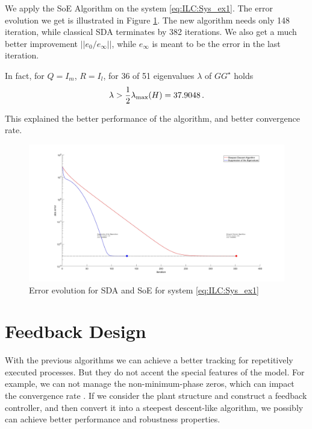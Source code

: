 \begin{exam}
	We apply the SoE Algorithm on the system \eqref{eq:ILC:Sys_ex1}. The error evolution we get is illustrated in Figure \ref{img:ILC:SDAvsSE}. The new algorithm needs only 148 iteration, while classical SDA terminates by 382 iterations. We also get a much better improvement $||e_0/e_\infty||$, while $e_\infty$  is meant to be the error in the last iteration. 
	
	In fact, for $Q = I_m$, $R = I_l$, for 36 of 51 eigenvalues $\lambda$ of $G G^\star$ holds 
	\begin{align}
	\lambda > \frac{1}{2}\lambda_{\mathrm{max}}(H) = 37.9048\, .
	\end{align}
	
	This explained the better performance of the algorithm, and better convergence rate.  		
	\begin{figure}[ht]
		\centering
		\includegraphics[width=\textwidth]{fig/Ex1_SDAvsES.jpg}
		\caption{Error evolution for SDA and SoE for system \eqref{eq:ILC:Sys_ex1}}
		\label{img:ILC:SDAvsSE}
	\end{figure}
	
\end{exam}

\section{Feedback Design}

With the previous algorithms we can achieve a better tracking for repetitively executed processes.  But they do not accent the special features of the model. For example, we can not manage the non-minimum-phase zeros, which can impact the convergence rate \cite{ILC}. 
If we consider the plant structure and construct a feedback controller, and then convert it into a steepest descent-like algorithm, we possibly can achieve better performance and robustness properties. 

